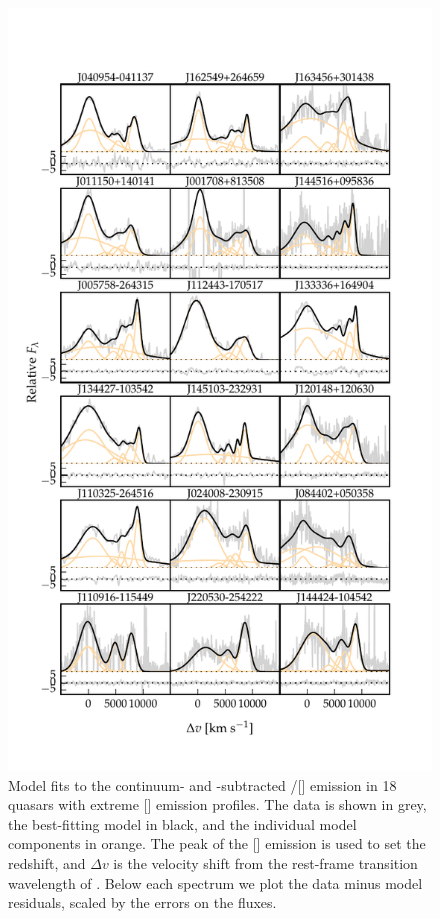 \begin{figure}
    \centering
    \includegraphics[width=1\columnwidth]{figures/chapter04/example_spectrum_grid_extreme_oiii.pdf} 
    \caption{Model fits to the continuum- and -subtracted \hbns/[] emission in 18 quasars with extreme [] emission profiles. The data is shown in grey, the best-fitting model in black, and the individual model components in orange. The peak of the [] emission is used to set the redshift, and $\Delta{v}$ is the velocity shift from the rest-frame transition wavelength of \hb. Below each spectrum we plot the data minus model residuals, scaled by the errors on the fluxes.}     
    \label{fig:example_spectrum_grid_extreme_oiii}
\end{figure}


